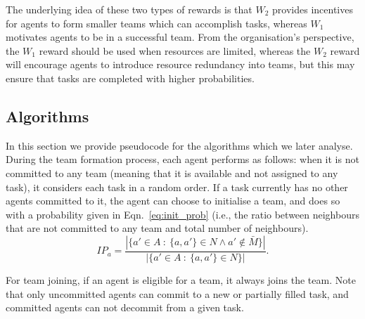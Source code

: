 \documentclass{llncs}
\begin{document}
The underlying idea of these two types of rewards is that $W_2$ provides
incentives for agents to form smaller teams which can accomplish tasks, whereas $W_1$
motivates agents to be in a successful team. From the organisation's perspective, the $W_1$ reward
should be used when resources are limited, whereas the $W_2$ reward will encourage agents to introduce
resource redundancy into teams, but this may ensure that tasks are completed with higher
probabilities.
\subsection{Algorithms}
In this section we provide pseudocode for the algorithms which we later analyse. During the team formation process, each agent performs as follows:
when it is not committed to any team (meaning that it is available and not assigned to any task), it considers each task in a random order. If a task currently
has no other agents committed to it, the agent can choose to initialise a team, and does so with a probability given in Eqn.~\eqref{eq:init_prob} (i.e.,
the ratio between neighbours that are not committed to any team and total number of neighbours).
\begin{equation}
IP_a = \frac{|\{ a' \in A\ :\ \{a, a'\} \in N \wedge a' \notin \bar{M}  \}|}{|\{ a' \in A\ :\ \{a, a'\} \in N \}|}.
\label{eq:init_prob}
\end{equation}

For team joining, if an agent is eligible for a team, it always joins the team. Note that only uncommitted agents can commit to
a new or partially filled task, and committed agents can not decommit from a given task.
%
\end{document}
